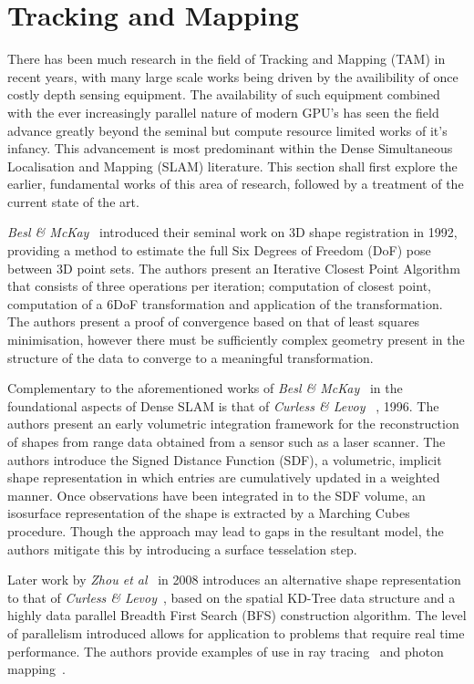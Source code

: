 \section{Tracking and Mapping}
\label{sec:lit_review_tam}
There has been much research in the field of Tracking and Mapping (TAM) in recent 
years, with many large scale works being driven by the availibility of once 
costly depth sensing equipment. The availability of such equipment combined 
with the ever increasingly parallel nature of modern GPU's has seen the 
field advance greatly beyond the seminal but compute resource limited works of it's 
infancy. This advancement is most predominant within the Dense Simultaneous 
Localisation and Mapping (SLAM) literature. This section shall first explore the 
earlier, fundamental works of this area of research, followed by a treatment 
of the current state of the art.

\textit{Besl \& McKay}~\cite{Besl1992} introduced their seminal work on 3D shape 
registration in 1992, providing a method to estimate the full Six Degrees of 
Freedom (DoF) pose between 3D point sets. The authors present an Iterative Closest 
Point Algorithm that consists of three operations per iteration; computation 
of closest point, computation of a 6DoF transformation and application of 
the transformation. The authors present a proof of convergence based on that 
of least squares minimisation, however there must be sufficiently complex 
geometry present in the structure of the data to converge to a meaningful 
transformation.

Complementary to the aforementioned works of \textit{Besl \& McKay}~\cite{Besl1992} 
in the foundational aspects of Dense SLAM is that of \textit{Curless \& Levoy} 
~\cite{Curless1996}, 1996. The authors present an early volumetric integration 
framework for the reconstruction of shapes from range data obtained from a 
sensor such as a laser scanner. The authors introduce the Signed Distance Function (SDF), 
a volumetric, implicit shape representation in which entries are cumulatively updated 
in a weighted manner. Once observations have been integrated in to the SDF volume, an 
isosurface representation of the shape is extracted by a Marching Cubes~\cite{Lorensen1987} 
procedure. Though the approach may lead to gaps in the resultant model, the authors 
mitigate this by introducing a surface tesselation step.

Later work by \textit{Zhou et al}~\cite{Zhou2008} in 2008 introduces an alternative 
shape representation to that of \textit{Curless \& Levoy}~\cite{Curless1996}, based 
on the spatial KD-Tree data structure and a highly data parallel Breadth First 
Search (BFS) construction algorithm. The level of parallelism introduced allows for 
application to problems that require real time performance. The authors provide 
examples of use in ray tracing~\cite{Purcell2002} and photon mapping~\cite{Kajiya1986}.

